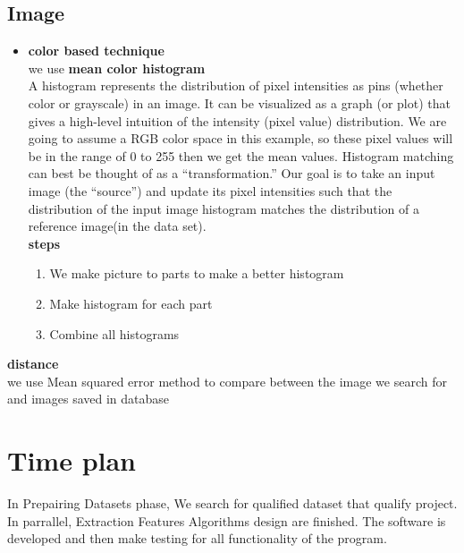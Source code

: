 \documentclass[pdftex,10pt,a4paper,oneside]{article}
\begin{document}
	\subsection{Image}
	\begin{itemize}
		\item \textbf{{\large color based technique}} \\
		we use \textbf{mean color histogram} \\
		A histogram represents the distribution of pixel intensities as pins (whether color or grayscale) in an image. It can be visualized as a graph (or plot) that gives a high-level intuition of the intensity (pixel value) distribution. We are going to assume a RGB color space in this example, so these pixel values will be in the range of 0 to 255 then we get the mean values.
		Histogram matching can best be thought of as a “transformation.” Our goal is to take an input image (the “source”) and update its pixel intensities such that the distribution of the input image histogram matches the distribution of a reference image(in the data set).\\
		\textbf{{\large steps}}\\
		\begin{enumerate}
			\item We make picture to parts to make a better histogram
			\item Make histogram for each part
			\item Combine all histograms 
		\end{enumerate}






	\end{itemize}

	
	\textbf{{\large distance}}\\
	we use Mean squared error method to compare between the image we search for and images saved in database 
	
	\pagebreak

		
	\pagebreak
	\section{Time plan}
In Prepairing Datasets phase, We search for qualified dataset that qualify project.
In parrallel, Extraction Features Algorithms design are finished. The software is
developed and then make testing for all functionality of the
program.
\end{document}
